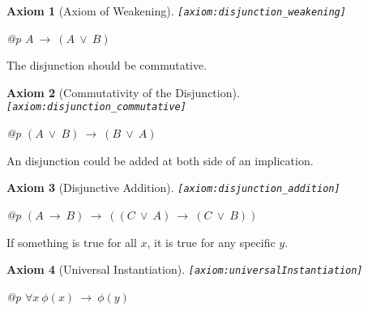\documentclass[a4paper,german,10pt,twoside]{book}
\newtheorem{ax}{Axiom}
\theoremstyle{definition}
\theoremstyle{remark}
\begin{document}
\begin{ax}[Axiom of Weakening]
\label{axiom:disjunction_weakening} \hypertarget{axiom:disjunction_weakening}{}
{\tt \tiny [\verb]axiom:disjunction_weakening]]}
\mbox{}
\begin{longtable}{{@{\extracolsep{\fill}}p{\linewidth}}}
\centering $A\ \rightarrow\ (A\ \lor\ B)$
\end{longtable}

\end{ax}


\par
The disjunction should be commutative.

\begin{ax}[Commutativity of the Disjunction]
\label{axiom:disjunction_commutative} \hypertarget{axiom:disjunction_commutative}{}
{\tt \tiny [\verb]axiom:disjunction_commutative]]}
\mbox{}
\begin{longtable}{{@{\extracolsep{\fill}}p{\linewidth}}}
\centering $(A\ \lor\ B)\ \rightarrow\ (B\ \lor\ A)$
\end{longtable}

\end{ax}


\par
An disjunction could be added at both side of an implication.

\begin{ax}[Disjunctive Addition]
\label{axiom:disjunction_addition} \hypertarget{axiom:disjunction_addition}{}
{\tt \tiny [\verb]axiom:disjunction_addition]]}
\mbox{}
\begin{longtable}{{@{\extracolsep{\fill}}p{\linewidth}}}
\centering $(A\ \rightarrow\ B)\ \rightarrow\ ((C\ \lor\ A)\ \rightarrow\ (C\ \lor\ B))$
\end{longtable}

\end{ax}


\par
If something is true for all $x$, it is true for any specific $y$.

\begin{ax}[Universal Instantiation]
\label{axiom:universalInstantiation} \hypertarget{axiom:universalInstantiation}{}
{\tt \tiny [\verb]axiom:universalInstantiation]]}
\mbox{}
\begin{longtable}{{@{\extracolsep{\fill}}p{\linewidth}}}
\centering $\forall x\ \phi(x)\ \rightarrow\ \phi(y)$
\end{longtable}

\end{ax}
\end{document}

